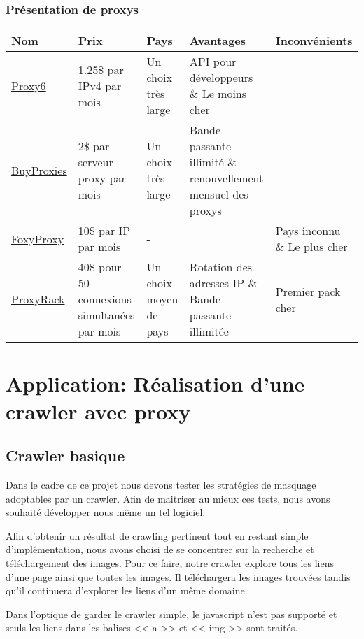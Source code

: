 \documentclass[hideweeklyreports,noposter]{polytech/polytech}
\begin{document}
		\section{Présentation de proxys}
			\begin{center}
				\centering
				\begin{tabularx}{\textwidth}{|X|X|X|X|X|}
					\hline
					Nom & Prix & Pays & Avantages & Inconvénients\\\hline
					\href{https://proxy6.net/}{Proxy6} & 1.25\$ par IPv4 par mois & Un choix très large & API pour développeurs \& Le moins cher & \\\hline
					\href{https://buyproxies.org/}{BuyProxies} & 2\$ par serveur proxy par mois & Un choix très large & Bande passante illimité \& renouvellement mensuel des proxys & \\\hline
					\href{https://getfoxyproxy.org/}{FoxyProxy} & 10\$ par IP par mois & - & & Pays inconnu \& Le plus cher\\\hline
					\href{https://proxyrack.com/}{ProxyRack} & 40\$ pour 50 connexions simultanées par mois & Un choix moyen de pays & Rotation des adresses IP \& Bande passante illimitée & Premier pack cher\\\hline
				\end{tabularx}
			\end{center}
		
\part{Application: Réalisation d'une crawler avec proxy}
	\chapter{Crawler basique}
		Dans le cadre de ce projet nous devons tester les stratégies de masquage adoptables par un crawler.
		Afin de maitriser au mieux ces tests, nous avons souhaité développer nous même un tel logiciel.
		
		Afin d'obtenir un résultat de crawling pertinent tout en restant simple d'implémentation, nous avons choisi de se concentrer sur la recherche et téléchargement des images.
		Pour ce faire, notre crawler explore tous les liens d'une page ainsi que toutes les images.
		Il téléchargera les images trouvées tandis qu'il continuera d'explorer les liens d'un même domaine.
		
		Dans l'optique de garder le crawler simple, le javascript n'est pas supporté et seuls les liens dans les balises << a >> et << img >> sont traités.
		
\end{document}

